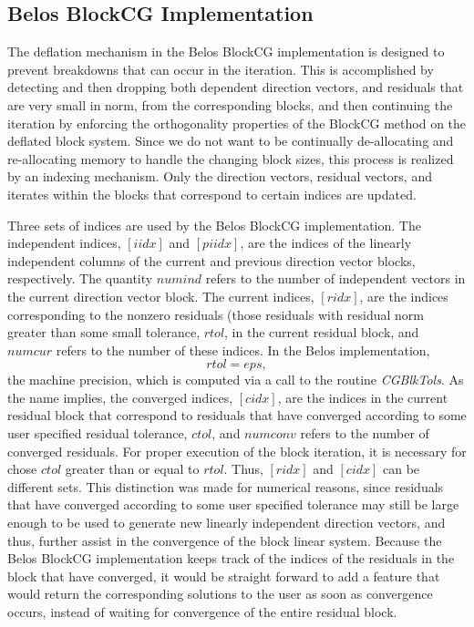 \documentclass{article}
\newcommand{\dm}{\begin{displaymath}}
\newcommand{\edm}{\end{displaymath}}
\begin{document}
\subsection{Belos BlockCG Implementation}
\label{sec:belosblkcg}

The deflation mechanism in the Belos BlockCG implementation is
designed to prevent breakdowns that can occur in the iteration.
This is accomplished by detecting and then dropping both dependent
direction vectors, and residuals that are very small in norm, from
the corresponding blocks, and then continuing the iteration by
enforcing the orthogonality properties of the BlockCG method on
the deflated block system. Since we do not want to be continually
de-allocating and re-allocating memory to handle the changing
block sizes, this process is realized by an indexing mechanism.
Only the direction vectors, residual vectors, and iterates within
the blocks that correspond to certain indices are updated.

Three sets of indices are used by the Belos BlockCG
implementation. The independent indices, $[iidx]$ and $[piidx]$,
are the indices of the linearly independent columns of the current
and previous direction vector blocks, respectively. The quantity
$numind$ refers to the number of independent vectors in the
current direction vector block. The current indices, $[ridx]$, are
the indices corresponding to the nonzero residuals (those
residuals with residual norm greater than some small tolerance,
$rtol$, in the current residual block, and $numcur$ refers to the
number of these indices. In the Belos implementation,
 \dm
 rtol = eps,
 \edm
the machine precision, which is computed via a call to the routine
{\it CGBlkTols}.  As the name implies, the converged indices,
$[cidx]$, are the indices in the current residual block that
correspond to residuals that have converged according to some user
specified residual tolerance, $ctol$, and $numconv$ refers to the
number of converged residuals. For proper execution of the block
iteration, it is necessary for chose $ctol$ greater than or equal
to $rtol$. Thus, $[ridx]$ and $[cidx]$ can be different sets. This
distinction was made for numerical reasons, since residuals that
have converged according to some user specified tolerance may
still be large enough to be used to generate new linearly
independent direction vectors, and thus, further assist in the
convergence of the block linear system. Because the Belos BlockCG
implementation keeps track of the indices of the residuals in the
block that have converged, it would be straight forward to add a
feature that would return the corresponding solutions to the user
as soon as convergence occurs, instead of waiting for convergence
of the entire residual block.
\end{document}
